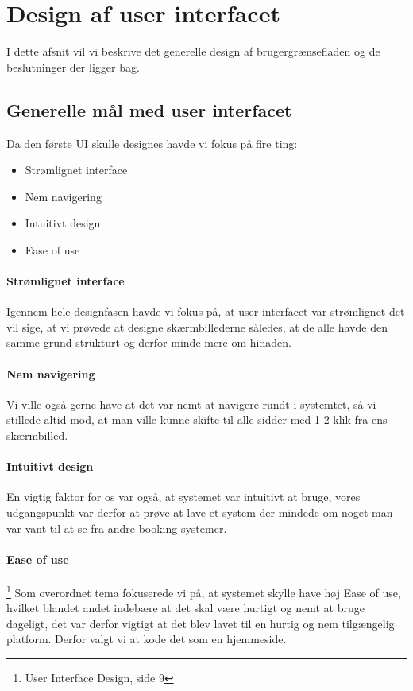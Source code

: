 \section{Design af user interfacet}
I dette afsnit vil vi beskrive det generelle design af brugergrænsefladen og de beslutninger der ligger bag.

\subsection{Generelle mål med user interfacet}
Da den første UI skulle designes havde vi fokus på fire ting:
\begin{itemize}
\item Strømlignet interface
\item Nem navigering
\item Intuitivt design
\item Ease of use
\end{itemize}
\paragraph{Strømlignet interface}
Igennem hele designfasen havde vi fokus på, at user interfacet var strømlignet det vil sige, at vi prøvede at designe skærmbillederne således, at de alle havde den samme grund strukturt og derfor minde mere om hinaden.
\paragraph{Nem navigering}
Vi ville også gerne have at det var nemt at navigere rundt i systemtet, så vi stillede altid mod, at man ville kunne skifte til alle sidder med 1-2 klik fra ens skærmbilled.
\paragraph{Intuitivt design}
En vigtig faktor for os var også, at systemet var intuitivt at bruge, vores udgangspunkt var derfor at prøve at lave et system der mindede om noget man var vant  til at se fra andre booking systemer.
\paragraph{Ease of use}\footnote{User Interface Design, side 9}
Som overordnet tema fokuserede vi på, at systemet skylle have høj Ease of use, hvilket blandet andet indebære at det skal være hurtigt og nemt at bruge dageligt, det var derfor vigtigt at det blev lavet til en hurtig og nem tilgængelig platform. Derfor valgt vi at kode det som en hjemmeside.

